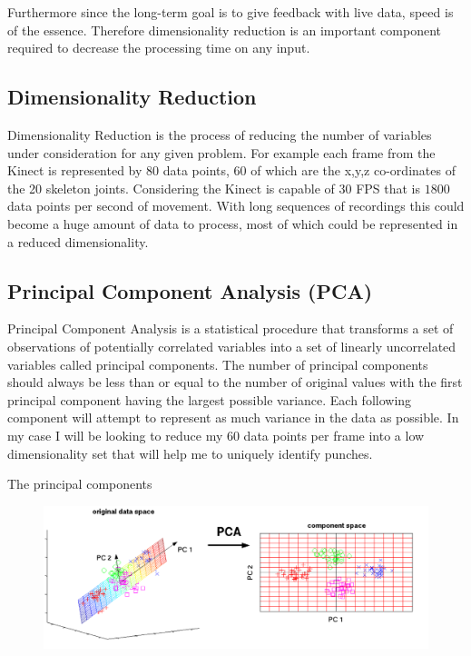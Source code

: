 Furthermore since the long-term goal is to give feedback with live data, speed is of the essence. Therefore dimensionality reduction is an important component required to decrease the processing time on any input.

\subsection{Dimensionality Reduction}
Dimensionality Reduction is the process of reducing the number of variables under consideration for any given problem. For example each frame from the Kinect is represented by 80 data points, 60 of which are the x,y,z co-ordinates of the 20 skeleton joints. Considering the Kinect is capable of 30 FPS that is $1800$ data points per second of movement. With long sequences of recordings this could become a huge amount of data to process, most of which could be represented in a reduced dimensionality.

\subsection{Principal Component Analysis (PCA)}
\label{subsec:subsec01}
Principal Component Analysis is a statistical procedure that transforms a set of observations of potentially correlated variables into a set of linearly uncorrelated variables called principal components. The number of principal components should always be less than or equal to the number of original values with the first principal component having the largest possible variance. Each following component will attempt to represent as much variance in the data as possible. In my case I will be looking to reduce my 60 data points per frame into a low dimensionality set that will help me to uniquely identify punches.

The principal components

\begin{figure}[h]
    \centering
    \includegraphics[height=0.25\textheight]{fig03/PCA.pdf}
    \label{fig:kinect}
\end{figure}

